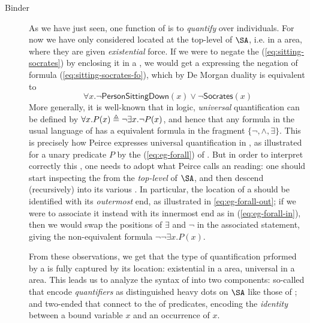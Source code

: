 \begin{scope}
\begin{scope}
\begin{description}
  \item[Binder] As we have just seen, one function of  is to \emph{quantify}
  over individuals. For now we have only considered  located at the top-level
  of $\SA$, i.e. in a \emph{} area, where they are given
  \emph{existential} force. If we were to negate the 
  (\ref{eq:sitting-socrates}) by enclosing it in a , we would get a 
  expressing the negation of formula (\ref{eq:sitting-socrates-fo}), which by De
  Morgan duality is equivalent to
  $$\forall x. \neg \mathsf{PersonSittingDown}(x) \vee \neg
  \mathsf{Socrates}(x)$$ More generally, it is well-known that in 
  logic, \emph{universal} quantification can be defined  by
  $\forall x. P(x) \triangleq \neg \exists x. \neg P(x)$, and hence that any formula
  in the usual language of  has a  equivalent formula in
  the fragment $\{\neg, \land, \exists\}$. This is precisely how Peirce
  expresses universal quantification in , as illustrated for a unary
  predicate $P$ by the  (\ref{eq:eg-forall}) of .
  But in order to interpret correctly this , one needs to adopt what
  Peirce calls an  reading: one should start inspecting the
   from the \emph{top-level} of $\SA$, and then descend (recursively)
  into its various . In particular, the location of a  should
  be identified with its \emph{outermost} end, as illustrated in 
  \ref{eq:eg-forall-out}; if we were to associate it instead with its innermost
  end as in  (\ref{eq:eg-forall-in}), then we would swap the positions
  of $\exists$ and $\neg$ in the associated statement, giving the non-equivalent
  formula $\neg \neg \exists x. P(x)$.

  \AP
  From these observations, we get that the type of quantification prformed by a
   is fully captured by its location: existential in a 
  area, universal in a  area. This leads us to analyze the syntax
  of  into two components: so-called  that encode
  \emph{quantifiers} as distinguished heavy dots on $\SA$ like those of
  ; and two-ended  that connect  to the
   of predicates, encoding the \emph{identity} between a bound
  variable $x$ and an occurrence of $x$.
  

\end{description}
\end{scope}
\end{scope}
